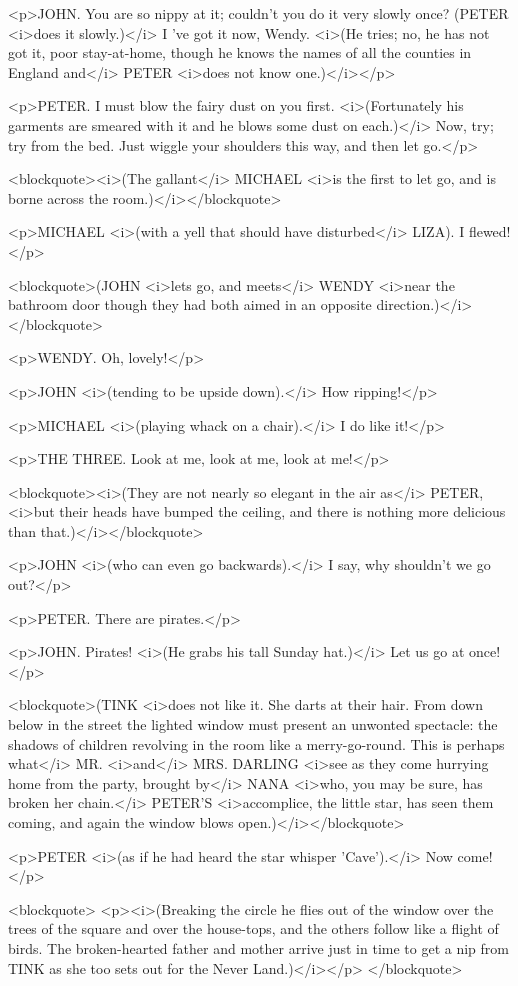 <p>JOHN. You are so nippy at it; couldn't you do it very slowly once?
(PETER <i>does it slowly.)</i> I 've got it now, Wendy. <i>(He tries;
no, he has not got it, poor stay-at-home, though he knows the names
of all the counties in England and</i> PETER <i>does not know
one.)</i></p>

<p>PETER. I must blow the fairy dust on you first. <i>(Fortunately
his garments are smeared with it and he blows some dust on each.)</i>
Now, try; try from the bed. Just wiggle your shoulders this way, and
then let go.</p>

<blockquote><i>(The gallant</i> MICHAEL <i>is the first to let go,
and is borne across the room.)</i></blockquote>

<p>MICHAEL <i>(with a yell that should have disturbed</i> LIZA). I
flewed!</p>

<blockquote>(JOHN <i>lets go, and meets</i> WENDY <i>near the
bathroom door though they had both aimed in an opposite
direction.)</i></blockquote>

<p>WENDY. Oh, lovely!</p>

<p>JOHN <i>(tending to be upside down).</i> How ripping!</p>

<p>MICHAEL <i>(playing whack on a chair).</i> I do like it!</p>

<p>THE THREE. Look at me, look at me, look at me!</p>

<blockquote><i>(They are not nearly so elegant in the air as</i>
PETER, <i>but their heads have bumped the ceiling, and there is
nothing more delicious than that.)</i></blockquote>

<p>JOHN <i>(who can even go backwards).</i> I say, why shouldn't we
go out?</p>

<p>PETER. There are pirates.</p>

<p>JOHN. Pirates! <i>(He grabs his tall Sunday hat.)</i> Let us go at
once!</p>

<blockquote>(TINK <i>does not like it. She darts at their hair. From
down below in the street the lighted window must present an unwonted
spectacle: the shadows of children revolving in the room like a
merry-go-round. This is perhaps what</i> MR. <i>and</i> MRS. DARLING
<i>see as they come hurrying home from the party, brought by</i> NANA
<i>who, you may be sure, has broken her chain.</i> PETER'S
<i>accomplice, the little star, has seen them coming, and again the
window blows open.)</i></blockquote>

<p>PETER <i>(as if he had heard the star whisper 'Cave').</i> Now
come!</p>

<blockquote>
<p><i>(Breaking the circle he flies out of the window over the trees
of the square and over the house-tops, and the others follow like a
flight of birds. The broken-hearted father and mother arrive just in
time to get a nip from TINK as she too sets out for the Never
Land.)</i></p>
</blockquote>
